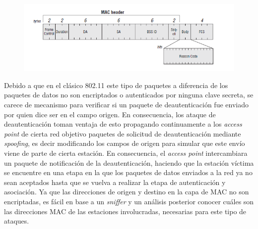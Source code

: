 \documentclass[10pt,a4paper]{article}
\begin{document}
\begin{figure}[H]
\centerline{\includegraphics[scale=0.8]{images/deauthentication_frame.png}}
\caption{}
\end{figure}

Debido a que en el clásico 802.11 este tipo de paquetes a diferencia de los paquetes de datos no son encriptados o autenticados por ninguna clave secreta, se carece de mecanismo para verificar si un paquete de deautenticación fue enviado por quien dice ser en el campo origen. En consecuencia, los ataque de deautenticación toman ventaja de esto propagando continuamente a los \textit{access point} de cierta red objetivo paquetes de solicitud de deautenticación mediante \textit{spoofing}, es decir modificando los campos de origen para simular que este envío viene de parte de cierta estación. En consecuencia, el \textit{access point} intercambiara un paquete de notificación de la deautenticación, haciendo que la estación víctima se encuentre en una etapa en la que los paquetes de datos enviados a la red ya no sean aceptados hasta que se vuelva a realizar la etapa de autenticación y asociación. Ya que las direcciones de origen y destino en la capa de MAC no son encriptadas, es fácil en base a un \textit{sniffer} y un análisis posterior conocer cuáles son las direcciones MAC de las estaciones involucradas, necesarias para este tipo de ataques.
\end{document}
